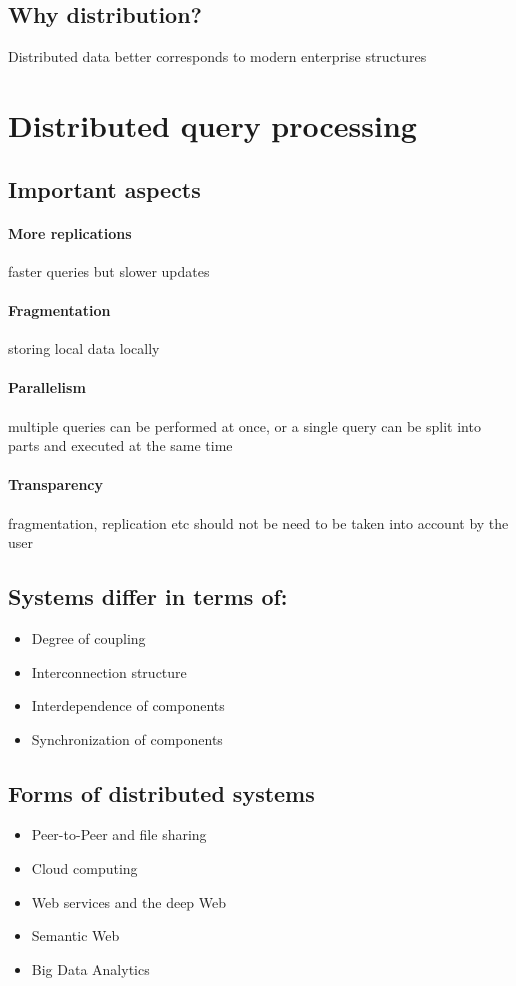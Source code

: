 \documentclass[10pt,a4paper]{article}
\begin{document}
\subsection{Why distribution?} Distributed data better corresponds to modern enterprise structures


\section{Distributed query processing}
\subsection{Important aspects}
	\paragraph{More replications} faster queries but slower updates
	\paragraph{Fragmentation} storing local data locally
	\paragraph{Parallelism} multiple queries can be performed at once, or a single query can be split into parts and executed at the same time
	\paragraph{Transparency} fragmentation, replication etc should not be need to be taken into account by the user
	
\subsection{Systems differ in terms of:}
	\begin{itemize}
		\item Degree of coupling
		\item Interconnection structure
		\item Interdependence of components
		\item Synchronization of components
	\end{itemize}

\subsection{Forms of distributed systems}
	\begin{itemize}
		\item Peer-to-Peer and file sharing
		\item Cloud computing
		\item Web services and the deep Web
		\item Semantic Web
		\item Big Data Analytics
	\end{itemize}
\end{document}

